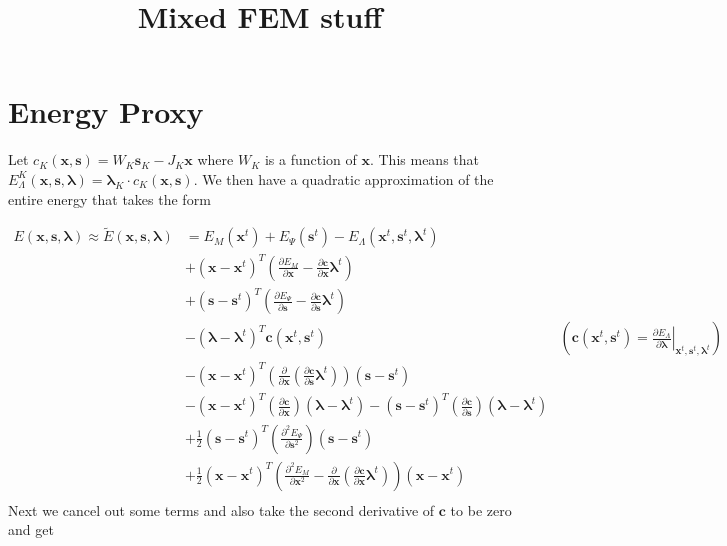 \documentclass[letterpaper,12pt]{article}
\theoremstyle{remark}
\newcommand{\x}{\mathbf{x}}
\newcommand{\C}{\mathbf{c}}
\newcommand{\s}{\mathbf{s}}
\newcommand{\la}{\mathbf{\lambda}}
\newcommand{\El}{E_\Lambda}
\begin{document}
\title{Mixed FEM stuff}
\date{}
\maketitle



%

\section{Energy Proxy}
Let $c_K(\x,\s) = W_K \s_K - J_K \x$ where $W_K$ is a function of $\x$. This means that $\El^K(\x,\s,\la) = \la_K \cdot c_K(\x,\s)$. We then have a quadratic approximation of the entire energy that takes the form

\begin{align*}
E(\x,\s,\la) \approx \tilde{E}(\x,\s,\la) &= E_M(\x^t) + E_\Psi(\s^t) - \El(\x^t,\s^t,\la^t) \\
&+ 
(\x - \x^t)^T \left(
	\frac{\partial E_M}{\partial \x} 
 -  \frac{\partial \C}{\partial \x} \la^t \right) & \\
&+ (\s - \s^t)^T \left(
	\frac{\partial E_\Psi}{\partial \s} 
 -  \frac{\partial \C}{\partial \s} \la^t \right)  & \\
&- (\la - \la^t)^T \C (\x^t, \s^t) & \left(\C (\x^t,\s^t) = \left. \frac{\partial \El}{\partial \la} \right|_{\x^t,\s^t,\la^t}\right) \\
& - (\x - \x^t)^T \left(
  \frac{\partial}{\partial \x} \left(\frac{\partial \C}{\partial \s} \la^t\right) \right)(\s - \s^t) & \\
& - (\x - \x^t)^T \left(
  \frac{\partial \C }{\partial \x} \right)(\la - \la^t) 
- (\s - \s^t)^T \left(
  \frac{\partial \C }{\partial \s} \right)(\la - \la^t) & \\
& + \frac{1}{2} (\s- \s^t)^T \left(\frac{\partial^2 E_\Psi}{\partial \s^2} \right)(\s - \s^t) & \\
& + \frac{1}{2}(\x- \x^t)^T \left(\frac{\partial^2 E_M}{\partial \x^2} -
\frac{\partial}{\partial \x} \left(\frac{\partial \C}{\partial \x} \la^t\right)
\right)(\x - \x^t) & \\
\end{align*}
Next we cancel out some terms and also take the second derivative of $\C$ to be zero and get
\end{document}
